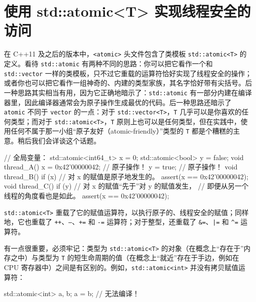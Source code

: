 \section{使用 std::atomic<T> 实现线程安全的访问}

在 C++11 及之后的版本中，\texttt{<atomic>\allowbreak{}} 头文件包含了类模板 \texttt{std::\allowbreak{}atomic<\allowbreak{}T>\allowbreak{}} 的定义。看待 \texttt{std::\allowbreak{}atomic} 有两种不同的思路：你可以把它看作一个和 \texttt{std::\allowbreak{}vector} 一样的类模板，只不过它重载的运算符恰好实现了线程安全的操作；或者你也可以把它看作一组神奇的、内建的类型家族，其名字恰好带有尖括号。后一种思路其实相当有用，因为它正确地暗示了：\texttt{std::\allowbreak{}atomic} 有一部分内建在编译器里，因此编译器通常会为原子操作生成最优的代码。后一种思路还暗示了 \texttt{atomic} 不同于 \texttt{vector} 的一点：对于 \texttt{std::\allowbreak{}vector<\allowbreak{}T>\allowbreak{}}，\texttt{T} 几乎可以是你喜欢的任何类型；而对于 \texttt{std::\allowbreak{}atomic<\allowbreak{}T>\allowbreak{}}，\texttt{T} 原则上也可以是任何类型，但在实践中，使用任何不属于那一小组“原子友好（atomic-friendly）”类型的 \texttt{T} 都是个糟糕的主意。稍后我们会详谈这个话题。

\begin{codebox}[cpp]
    // 全局变量：
    std::atomic<int64_t> x = 0;
    std::atomic<bool> y = false;
    void thread_A() {
      x = 0x42'00000042; // 原子操作！
      y = true; // 原子操作！
    }
    void thread_B() {
      if (x) {
        // 对 x 的赋值是原子地发生的。
        assert(x == 0x42'00000042);
      }
    }
    void thread_C() {
      if (y) {
        // 对 x 的赋值“先于”对 y 的赋值发生，
        // 即便从另一个线程的角度看也是如此。
        assert(x == 0x42'00000042);
      }
    }
\end{codebox}

\texttt{std::\allowbreak{}atomic<\allowbreak{}T>\allowbreak{}} 重载了它的赋值运算符，以执行原子的、线程安全的赋值；同样地，它也重载了 \texttt{++}、\texttt{--}、\texttt{+=} 和 \texttt{-=} 运算符；对于整型，还重载了 \texttt{\&=}、\texttt{|=} 和 \texttt{\string^=} 运算符。

有一点很重要，必须牢记：类型为 \texttt{std::\allowbreak{}atomic<\allowbreak{}T>\allowbreak{}} 的对象（在概念上“存在于”内存之中）与类型为 \texttt{T} 的短生命周期的值（在概念上“就近”存在于手边，例如在 CPU 寄存器中）之间是有区别的。例如，\texttt{std::\allowbreak{}atomic<\allowbreak{}int>\allowbreak{}} 并没有拷贝赋值运算符：

\begin{codebox}[cpp]
    std::atomic<int> a, b;
    a = b; // 无法编译！
\end{codebox}


